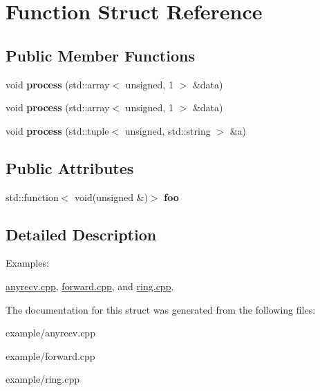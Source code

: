 \hypertarget{structFunction}{}\section{Function Struct Reference}
\label{structFunction}
\subsection*{Public Member Functions}
\begin{DoxyCompactItemize}
\item 
\hypertarget{structFunction_a7e02d9958425563890a00afdb91f1cbe}{}void {\bfseries process} (std\+::array$<$ unsigned, 1 $>$ \&data)\label{structFunction_a7e02d9958425563890a00afdb91f1cbe}

\item 
\hypertarget{structFunction_a7e02d9958425563890a00afdb91f1cbe}{}void {\bfseries process} (std\+::array$<$ unsigned, 1 $>$ \&data)\label{structFunction_a7e02d9958425563890a00afdb91f1cbe}

\item 
\hypertarget{structFunction_a1f62c3fa804fcf66490355697c255472}{}void {\bfseries process} (std\+::tuple$<$ unsigned, std\+::string $>$ \&a)\label{structFunction_a1f62c3fa804fcf66490355697c255472}

\end{DoxyCompactItemize}
\subsection*{Public Attributes}
\begin{DoxyCompactItemize}
\item 
\hypertarget{structFunction_a330b0bdadf59d79668e29033680f5c92}{}std\+::function$<$ void(unsigned \&)$>$ {\bfseries foo}\label{structFunction_a330b0bdadf59d79668e29033680f5c92}

\end{DoxyCompactItemize}


\subsection{Detailed Description}
\begin{Desc}
\item[Examples\+: ]\par
\hyperlink{anyrecv_8cpp-example}{anyrecv.\+cpp}, \hyperlink{forward_8cpp-example}{forward.\+cpp}, and \hyperlink{ring_8cpp-example}{ring.\+cpp}.\end{Desc}


The documentation for this struct was generated from the following files\+:\begin{DoxyCompactItemize}
\item 
example/anyrecv.\+cpp\item 
example/forward.\+cpp\item 
example/ring.\+cpp\end{DoxyCompactItemize}
